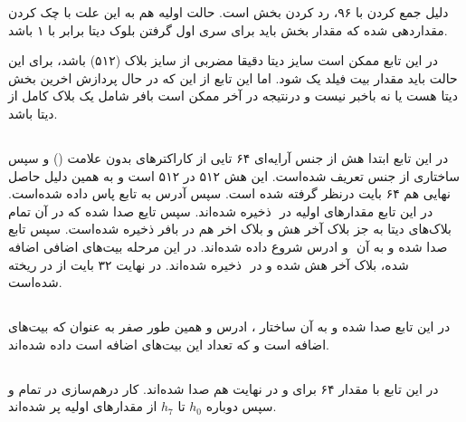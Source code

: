 دلیل جمع کردن  با ۹۶،‌ رد کردن بخش  است. حالت اولیه  هم به این علت با چک کردن  مقداردهی شده که مقدار بخش  باید برای سری اول گرفتن بلوک دیتا برابر با ۱ باشد. 

در این تابع ممکن است سایز دیتا دقیقا مضربی از سایز بلاک (۵۱۲) باشد،‌ برای این حالت باید مقدار بیت فیلد  یک شود. اما این تابع از این که در حال پردازش اخرین بخش دیتا هست یا نه باخبر نیست و درنتیجه در‌ آخر ممکن است بافر شامل یک بلاک کامل از دیتا باشد. 



\subsection{}
\label{subsec:skein-hash}

در این تابع ابتدا هش از جنس آرایه‌ای ۶۴ تایی از کاراکتر‌های بدون علامت () و سپس   ساختاری از جنس \hyperref[subsec:sph-skein-big-context]{} تعریف شده‌است. این هش ۵۱۲ در ۵۱۲ است و به همین دلیل حاصل نهایی هم ۶۴ بایت درنظر گرفته شده است. سپس آدرس  به تابع\hyperref[subsec:sph-skein512-init]{} پاس داده شده‌است. در این تابع مقدارهای اولیه در ‌ ذخیره شده‌اند. سپس تایع \hyperref[subsec:sph-skein512]{} صدا شده که در آن تمام بلاک‌های دیتا به جز بلاک آخر هش و بلاک ‌اخر هم در بافر ذخیره شده‌است. سپس تابع  \hyperref[subsec:sph-skein512-close]{} صدا شده و به آن ‌ و ادرس شروع  داده شده‌اند. در این مرحله بیت‌های اضافی اضافه شده، بلاک ‌آخر هش شده و در ‌ ذخیره شده‌اند. 
در نهایت ۳۲ بایت از  در  ریخته شده‌است.


\subsection{}
\label{subsec:sph-skein512-close}
\label{subsec:sph-close}
در این تابع   \hyperref[subsec:addbits]{}  صدا شده و به ‌آن  ساختار   ،  ادرس   و همین طور صفر به عنوان  که بیت‌های اضافه است و  که تعداد این بیت‌های اضافه است داده شده‌اند.


\subsection{}
\label{subsec:addbits}
\label{subsec:sph-skein-addbits-and-close}
در این تابع  \hyperref[subsec:big-close]{} با مقدار ۶۴ برای  و در نهایت هم \hyperref[subsec:sph-skein512-init]{} صدا شده‌اند. کار درهم‌سازی در  تمام و سپس دوباره $ h_0 $ تا $ h_7 $ از مقدارهای اولیه پر شده‌اند.


